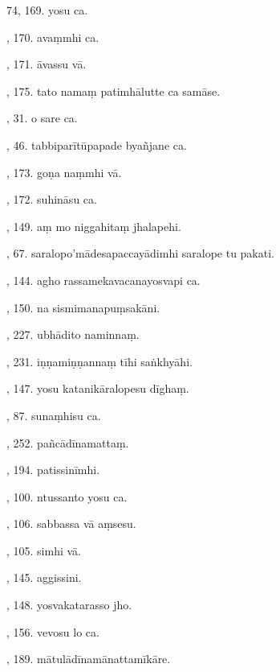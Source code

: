 74, 169. yosu ca.\hfill \pageref{sut:74}\par {}, 170. avaṃmhi ca.\hfill \pageref{sut:75}\par {}, 171. āvassu vā.\hfill \pageref{sut:76}\par {}, 175. tato namaṃ patimhālutte ca samāse.\hfill \pageref{sut:77}\par {}, 31. o sare ca.\hfill \pageref{sut:78}\par {}, 46. tabbiparītūpapade byañjane ca.\hfill \pageref{sut:79}\par {}, 173. goṇa naṃmhi vā.\hfill \pageref{sut:80}\par {}, 172. suhināsu ca.\hfill \pageref{sut:81}\par {}, 149. aṃ mo niggahitaṃ jhalapehi.\hfill \pageref{sut:82}\par {}, 67. saralopo’mādesapaccayādimhi saralope tu pakati.\hfill \pageref{sut:83}\par {}, 144. agho rassamekavacanayosvapi ca.\hfill \pageref{sut:84}\par {}, 150. na sismimanapuṃsakāni.\hfill \pageref{sut:85}\par {}, 227. ubhādito naminnaṃ.\hfill \pageref{sut:86}\par {}, 231. iṇṇamiṇṇannaṃ tīhi saṅkhyāhi.\hfill \pageref{sut:87}\par {}, 147. yosu katanikāralopesu dīghaṃ.\hfill \pageref{sut:88}\par {}, 87. sunaṃhisu ca.\hfill \pageref{sut:89}\par {}, 252. pañcādīnamattaṃ.\hfill \pageref{sut:90}\par {}, 194. patissinīmhi.\hfill \pageref{sut:91}\par {}, 100. ntussanto yosu ca.\hfill \pageref{sut:92}\par {}, 106. sabbassa vā aṃsesu.\hfill \pageref{sut:93}\par {}, 105. simhi vā.\hfill \pageref{sut:94}\par {}, 145. aggissini.\hfill \pageref{sut:95}\par {}, 148. yosvakatarasso jho.\hfill \pageref{sut:96}\par {}, 156. vevosu lo ca.\hfill \pageref{sut:97}\par {}, 189. mātulādīnamānattamīkāre.\hfill \pageref{sut:98}\par \noindent
